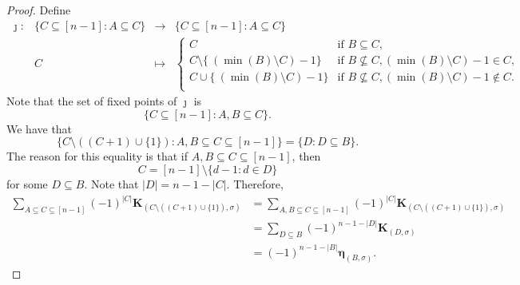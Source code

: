 \documentclass[10pt,a4paper]{amsart}
\newcommand{\boldeta}{{\boldsymbol{\eta}}}
\begin{document}
\begin{proof}
Define 
$$
\begin{array}{cccc}
\jmath:& \{C\subseteq [n-1]: A\subseteq C\} & \rightarrow& \{C\subseteq [n-1]: A\subseteq C\}\\
& C & \mapsto & 
\begin{cases} 
C & \text{if~}B\subseteq C,\\
 C\setminus\{\ (\min(B)\setminus C)-1 \} & \text{if~}  B\not\subseteq C, (\min(B)\setminus C)-1\in C,\\
 C\cup\{\ (\min(B)\setminus C)-1 \}  & \text{if~}  B\not\subseteq C, (\min(B)\setminus C)-1\not\in C.\\
\end{cases} 
\end{array} 
$$
Note that the set of fixed points of $\jmath$ is 
$$\{C\subseteq [n-1]: A,B\subseteq C\}.$$ 
We have that
$$\{C\setminus ( (C+1)\cup \{1\} ): A,B\subseteq C\subseteq [n-1]\}=\{ D: D\subseteq B \}.$$
The reason for this equality is that if $A,B\subseteq C\subseteq [n-1]$, then 
$$C=[n-1]\setminus \{d-1:d\in D\}$$ for some $D\subseteq B$.
Note that  $|D|=n-1-|C|$. 
Therefore, 
\begin{align*} 
\sum_{A\subseteq C\subseteq[n-1]}(-1)^{|C|}\mathbf{K}_{(C\setminus((C+1)\cup\{1\}),\sigma)}&=\sum_{A,B\subseteq C\subseteq[n-1]}(-1)^{|C|}\mathbf{K}_{(C\setminus((C+1)\cup\{1\}),\sigma)}\\
&=\sum_{D\subseteq B}(-1)^{n-1-|D|}\mathbf{K}_{(D,\sigma)}\\
&=(-1)^{n-1-|B|}\boldeta_{(B,\sigma)}.
\end{align*}

\end{proof} 
\end{document}
